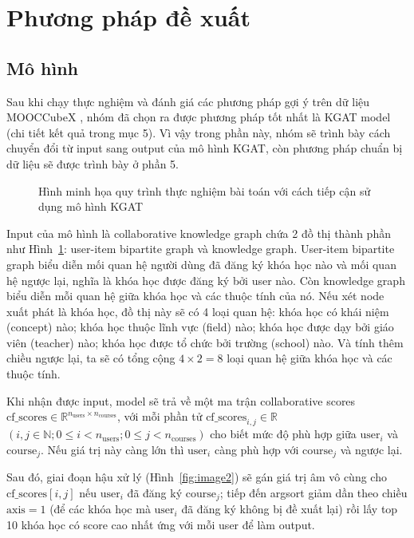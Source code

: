 \section{Phương pháp đề xuất}

\subsection{Mô hình}
Sau khi chạy thực nghiệm và đánh giá các phương pháp gợi ý trên dữ liệu MOOCCubeX \cite{mooccubex}, nhóm đã chọn ra được phương pháp tốt nhất là KGAT model (chi tiết kết quả trong mục 5). Vì vậy trong phần này, nhóm sẽ trình bày cách chuyển đổi từ input sang output của mô hình KGAT, còn phương pháp chuẩn bị dữ liệu sẽ được trình bày ở phần 5.

\begin{figure}[h]
    \centering
    \caption{Hình minh họa quy trình thực nghiệm bài toán với cách tiếp cận sử dụng mô hình KGAT}
    \label{fig:image1}
\end{figure}

Input của mô hình là collaborative knowledge graph chứa 2 đồ thị thành phần như Hình~\ref{fig:image1}: user-item bipartite graph và knowledge graph. User-item bipartite graph biểu diễn mối quan hệ người dùng đã đăng ký khóa học nào và mối quan hệ ngược lại, nghĩa là khóa học được đăng ký bởi user nào. Còn knowledge graph biểu diễn mỗi quan hệ giữa khóa học và các thuộc tính của nó. Nếu xét node xuất phát là khóa học, đồ thị này sẽ có 4 loại quan hệ: khóa học có khái niệm (concept) nào; khóa học thuộc lĩnh vực (field) nào; khóa học được dạy bởi giáo viên (teacher) nào; khóa học được tổ chức bởi trường (school) nào. Và tính thêm chiều ngược lại, ta sẽ có tổng cộng $4 \times 2 = 8$ loại quan hệ giữa khóa học và các thuộc tính.

Khi nhận được input, model sẽ trả về một ma trận collaborative scores $\text{cf\_scores} \in \mathbb{R}^{n_{\text{users}} \times n_{\text{courses}}}$, với mỗi phần tử $\text{cf\_scores}_{i,j} \in \mathbb{R}$ $(i,j \in \mathbb{N}; 0 \leq i < n_{\text{users}}; 0 \leq j < n_{\text{courses}})$ cho biết mức độ phù hợp giữa $\text{user}_i$ và $\text{course}_j$. Nếu giá trị này càng lớn thì $\text{user}_i$ càng phù hợp với $\text{course}_j$ và ngược lại.

Sau đó, giai đoạn hậu xử lý (Hình~\ref{fig:image2}) sẽ gán giá trị âm vô cùng cho $\text{cf\_scores}[i, j]$ nếu $\text{user}_i$ đã đăng ký $\text{course}_j$; tiếp đến argsort giảm dần theo chiều $\text{axis} = 1$ (để các khóa học mà $\text{user}_i$ đã đăng ký không bị đề xuất lại) rồi lấy top 10 khóa học có score cao nhất ứng với mỗi user để làm output.

